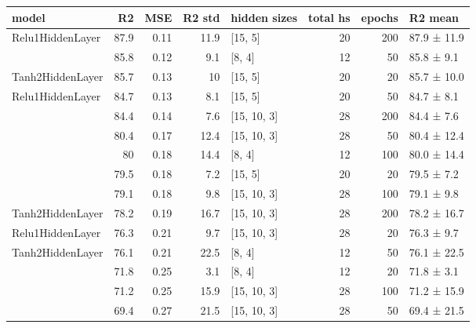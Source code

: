 
    \begin{table*}
        \centering
        \begin{tabular}{lrrrlrrl}
\hline
 model                             &   R2 &   MSE &   R2 std & hidden sizes   &   total hs &   epochs & R2 mean     \\
\hline
 \multirow{2}{*}{Relu1HiddenLayer} & 87.9 &  0.11 &     11.9 & [15, 5]        &         20 &      200 & 87.9 ± 11.9 \\
                                   & 85.8 &  0.12 &      9.1 & [8, 4]         &         12 &       50 & 85.8 ± 9.1  \\
 Tanh2HiddenLayer                  & 85.7 &  0.13 &     10   & [15, 5]        &         20 &       20 & 85.7 ± 10.0 \\
 \multirow{6}{*}{Relu1HiddenLayer} & 84.7 &  0.13 &      8.1 & [15, 5]        &         20 &       50 & 84.7 ± 8.1  \\
                                   & 84.4 &  0.14 &      7.6 & [15, 10, 3]    &         28 &      200 & 84.4 ± 7.6  \\
                                   & 80.4 &  0.17 &     12.4 & [15, 10, 3]    &         28 &       50 & 80.4 ± 12.4 \\
                                   & 80   &  0.18 &     14.4 & [8, 4]         &         12 &      100 & 80.0 ± 14.4 \\
                                   & 79.5 &  0.18 &      7.2 & [15, 5]        &         20 &       20 & 79.5 ± 7.2  \\
                                   & 79.1 &  0.18 &      9.8 & [15, 10, 3]    &         28 &      100 & 79.1 ± 9.8  \\
 Tanh2HiddenLayer                  & 78.2 &  0.19 &     16.7 & [15, 10, 3]    &         28 &      200 & 78.2 ± 16.7 \\
 Relu1HiddenLayer                  & 76.3 &  0.21 &      9.7 & [15, 10, 3]    &         28 &       20 & 76.3 ± 9.7  \\
 \multirow{5}{*}{Tanh2HiddenLayer} & 76.1 &  0.21 &     22.5 & [8, 4]         &         12 &       50 & 76.1 ± 22.5 \\
                                   & 71.8 &  0.25 &      3.1 & [8, 4]         &         12 &       20 & 71.8 ± 3.1  \\
                                   & 71.2 &  0.25 &     15.9 & [15, 10, 3]    &         28 &      100 & 71.2 ± 15.9 \\
                                   & 69.4 &  0.27 &     21.5 & [15, 10, 3]    &         28 &       50 & 69.4 ± 21.5 \\

\end{tabular}
\end{table*}
